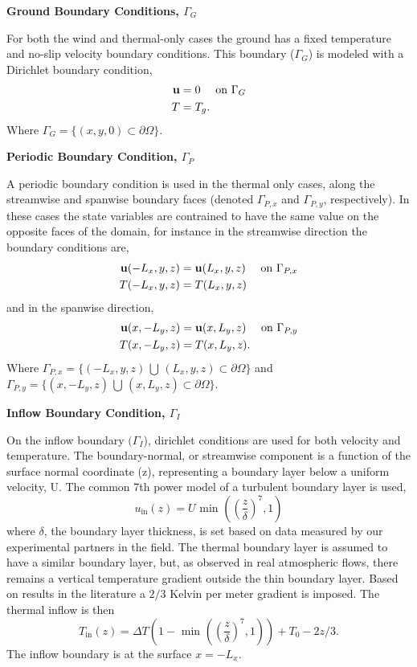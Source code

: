 \textbf{Ground Boundary Conditions, $\Gamma_G$} 

For both the wind and thermal-only cases the ground has a fixed
temperature and no-slip velocity boundary conditions. This boundary 
($\Gamma_G$) is modeled with a Dirichlet boundary condition, 
\begin{align}
 {\bf u} &= 0 \quad \text{ on } \Gamma_G \\
 T &= T_g.
\end{align}
Where $\Gamma_G = \{(x,y,0) \subset \partial \Omega \} $. 

%
%
%
\textbf{Periodic Boundary Condition, $\Gamma_P$} 

A periodic boundary condition is used in the thermal only cases, 
along the streamwise and spanwise boundary faces 
(denoted $\Gamma_{P,x}$ and $\Gamma_{P,y}$, respectively). In these
cases the state variables  
are contrained to have the same value on the opposite faces of the domain, 
for instance in the streamwise direction the boundary conditions are, 
\begin{align}
 {\bf u}(-L_x,y,z) &= {\bf u}(L_x,y,z) \quad \text{ on } \Gamma_{P,x} \\
 T(-L_x,y,z) &= T(L_x,y,z)
\end{align}
and in the spanwise direction,
\begin{align}
 {\bf u}(x,-L_y,z) &= {\bf u}(x,L_y,z) \quad \text{ on } \Gamma_{P,y} \\
 T(x,-L_y,z) &= T(x,L_y,z). 
\end{align}
Where $\Gamma_{P,x} = \{(-L_x,y,z) \, \bigcup \, (L_x,y,z) \subset \partial
\Omega \}$  
and $\Gamma_{P,y} = \{(x,-L_y,z) \, \bigcup \, (x,L_y,z) \subset \partial
\Omega \}$. 

\textbf{Inflow Boundary Condition, $\Gamma_I$} 

On the inflow boundary $(\Gamma_I$), dirichlet conditions are used for both
velocity and temperature. The boundary-normal, or streamwise component 
is a function of the surface normal coordinate (z), representing a boundary 
layer below a uniform velocity, U.
The common 7th power model of a turbulent boundary layer is used,   
\begin{equation*}
  u_{\text{in}}(z) = U \text{ min }\left(\left(\frac{z}{\delta}\right)^7,1\right)
  \label{eq:bl_u}
\end{equation*}
where $\delta$, the boundary layer thickness, is set based on data
measured by our experimental partners in the field. 
The thermal boundary layer is assumed to have a similar boundary layer,
but, as observed in real atmospheric flows, there remains a vertical
temperature gradient outside the thin boundary layer. Based on
results in the literature a $2/3$ Kelvin per meter gradient is 
imposed\cite{Blocken2007238}. The thermal inflow is then  
\begin{equation*}
  T_{\text{in}}(z) = \Delta T \left(1- \text{ min
			}\left(\left(\frac{z}{\delta}\right)^7,1\right)\right)
  + T_0 - 2z/3.  
  \label{eq:bl_t}
\end{equation*}
The inflow boundary is at the surface $x=-L_x$.

